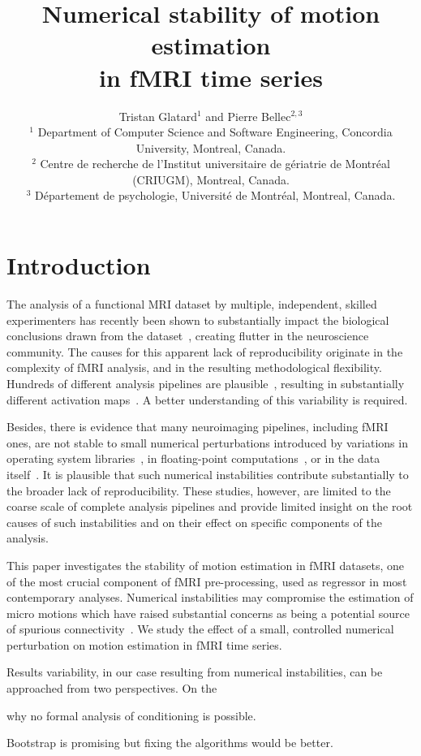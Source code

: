 \documentclass[11pt]{IEEEtran}
\title{Numerical stability of motion estimation\\ in fMRI time series}
\author{Tristan Glatard$^1$ and Pierre Bellec$^{2,3}$\\
$^1$ Department of Computer Science and Software Engineering, Concordia University, Montreal, Canada. \\
$^2$ Centre de recherche de l'Institut universitaire de gériatrie de Montréal (CRIUGM), Montreal, Canada.\\
$^3$ Département de psychologie, Université de Montréal, Montreal, Canada.

}
\begin{document}
\maketitle

\section{Introduction}

 The analysis of a functional MRI dataset by multiple, independent, skilled
 experimenters has recently been shown to substantially impact the
 biological conclusions drawn from the dataset~\cite{narps}, creating
 flutter in the neuroscience community. The causes for this apparent lack
 of reproducibility originate in the complexity of fMRI analysis, and in
 the resulting methodological flexibility. Hundreds of different analysis
 pipelines are plausible~\cite{carp}, resulting in substantially different
 activation maps~\cite{bowring}. A better understanding of this variability
 is required.

 Besides, there is evidence that many neuroimaging pipelines, including
 fMRI ones, are not stable to small numerical perturbations introduced by
 variations in operating system libraries~\cite{gronenschild2012effects,
 glatard2015reproducibility}, in floating-point computations~\cite{greg},
 or in the data itself~\cite{lindsay}. It is plausible that such numerical
 instabilities contribute substantially to the broader lack of
 reproducibility. These studies, however, are limited to the coarse scale
 of complete analysis pipelines and provide limited insight on the root
 causes of such instabilities and on their effect on specific components of
 the analysis.

 This paper investigates the stability of motion estimation in fMRI
 datasets, one of the most crucial component of fMRI pre-processing, used
 as regressor in most contemporary analyses. Numerical instabilities may
 compromise the estimation of micro motions which have raised substantial
 concerns as being a potential source of spurious
 connectivity~\cite{power2012spurious}. We study the effect of a small,
 controlled numerical perturbation on motion estimation in fMRI time
 series.

 Results variability, in our case resulting from numerical instabilities, 
 can be approached from two perspectives. On the 

 why no formal analysis of conditioning is possible.

Bootstrap is promising but fixing the algorithms would be better.
\end{document}
